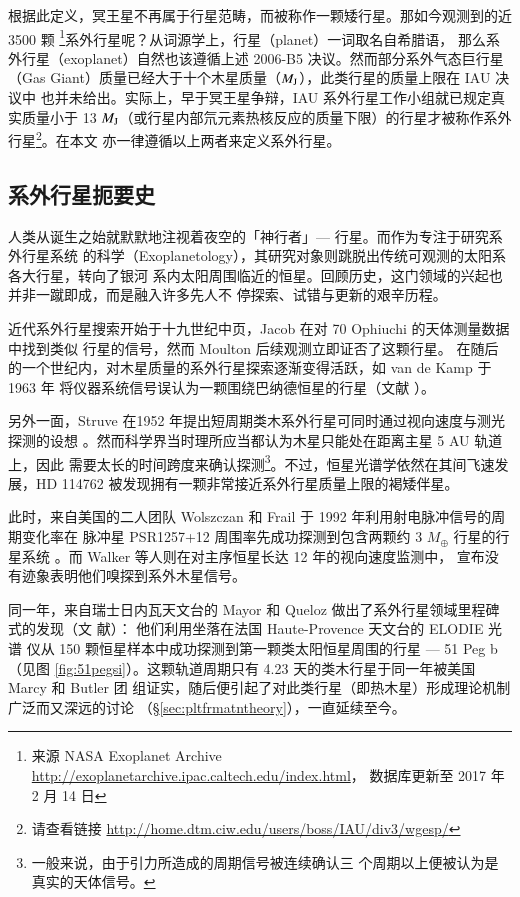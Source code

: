 根据此定义，冥王星不再属于行星范畴，而被称作一颗矮行星。那如今观测到的近 3500 颗
\footnote{来源 NASA Exoplanet Archive \url{http://exoplanetarchive.ipac.caltech.edu/index.html}，
数据库更新至 2017 年 2 月 14 日}系外行星呢？从词源学上，行星（planet）一词取名自希腊语，
那么系外行星（exoplanet）自然也该遵循上述 2006-B5 决议。然而部分系外气态巨行星
（Gas Giant）质量已经大于十个木星质量（$M_\mathrm{J}$），此类行星的质量上限在 IAU 决议中
也并未给出。实际上，早于冥王星争辩，IAU 系外行星工作小组就已规定真实质量小于 13 
$M_\mathrm{J}$（或行星内部氘元素热核反应的质量下限\cite{Baraffe2003}）的行星才被称作系外
行星\footnote{请查看链接 \url{http://home.dtm.ciw.edu/users/boss/IAU/div3/wgesp/}}。在本文
亦一律遵循以上两者来定义系外行星。


\subsection{系外行星扼要史} 

人类从诞生之始就默默地注视着夜空的「神行者」--- 行星。而作为专注于研究系外行星系统
的科学（Exoplanetology），其研究对象则跳脱出传统可观测的太阳系各大行星，转向了银河
系内太阳周围临近的恒星。回顾历史，这门领域的兴起也并非一蹴即成，而是融入许多先人不
停探索、试错与更新的艰辛历程。

近代系外行星搜索开始于十九世纪中页，Jacob 在对 70 Ophiuchi 的天体测量数据中找到类似
行星的信号\cite{Jacob1855}，然而 Moulton 后续观测立即证否了这颗行星\cite{Moulton1899}。
在随后的一个世纪内，对木星质量的系外行星探索逐渐变得活跃，如 van de Kamp 于 1963 年
将仪器系统信号误认为一颗围绕巴纳德恒星的行星（文献 ）。

另外一面，Struve 在1952 年提出短周期类木系外行星可同时通过视向速度与测光探测的设想
\cite{Struve1952}。然而科学界当时理所应当都认为木星只能处在距离主星 5 AU 轨道上，因此
需要太长的时间跨度来确认探测\footnote{一般来说，由于引力所造成的周期信号被连续确认三
个周期以上便被认为是真实的天体信号。}。不过，恒星光谱学依然在其间飞速发展，HD 114762 
被发现拥有一颗非常接近系外行星质量上限的褐矮伴星\cite{Latham1989}。

此时，来自美国的二人团队 Wolszczan 和 Frail 于 1992 年利用射电脉冲信号的周期变化率在
脉冲星 PSR1257+12 周围率先成功探测到包含两颗约 3 $M_\oplus$ 行星的行星系统
\cite{WolszczanFrail1992}。而 Walker 等人则在对主序恒星长达 12 年的视向速度监测中，
宣布没有迹象表明他们嗅探到系外木星信号\cite{Walkeretal1995}。

同一年，来自瑞士日内瓦天文台的 Mayor 和 Queloz 做出了系外行星领域里程碑式的发现（文
献）： 他们利用坐落在法国 Haute-Provence 天文台的 ELODIE 光谱
仪从 150 颗恒星样本中成功探测到第一颗类太阳恒星周围的行星  --- 51 Peg b（见图 
\ref{fig:51pegsi}）。这颗轨道周期只有 4.23 天的类木行星于同一年被美国 Marcy 和 Butler 团
组证实，随后便引起了对此类行星（即热木星）形成理论机制广泛而又深远的讨论
（\S \ref{sec:pltfrmatntheory}），一直延续至今。

